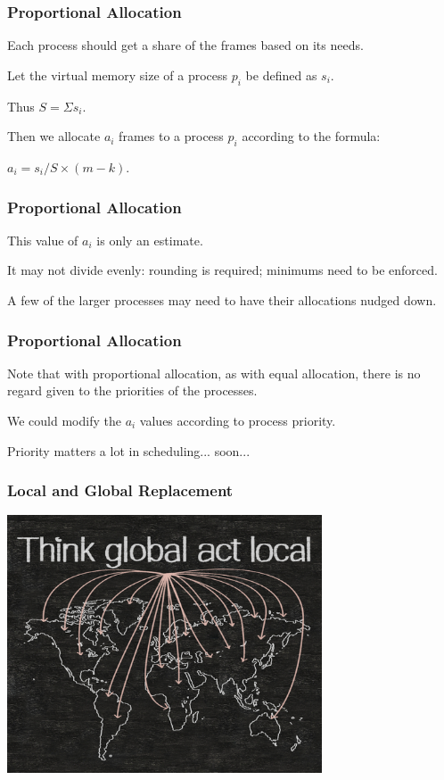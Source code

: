\begin{frame}
\frametitle{Proportional Allocation}

Each process should get a share of the frames based on its needs. 

Let the virtual memory size of a process $p_{i}$ be defined as $s_{i}$. 

Thus $S = \Sigma s_{i}$. 

Then we allocate $a_{i}$ frames to a process $p_{i}$ according to the formula: 

$a_{i} = s_{i} / S \times (m - k)$.

\end{frame}

\begin{frame}
\frametitle{Proportional Allocation}

This value of $a_{i}$ is only an estimate. 

It may not divide evenly: rounding is required; minimums need to be enforced.

A few of the larger processes may need to have their allocations nudged down.


\end{frame}

\begin{frame}
\frametitle{Proportional Allocation}

Note that with proportional allocation, as with equal allocation, there is no regard given to the priorities of the processes. 

We could modify the $a_{i}$ values according to process priority. 

Priority matters a lot in scheduling... soon...

\end{frame}

\begin{frame}
\frametitle{Local and Global Replacement}

\begin{center}
	\includegraphics[width=0.7\textwidth]{images/global-local.jpg}
\end{center}

\end{frame}

